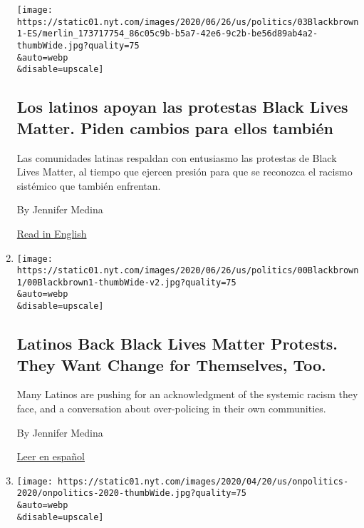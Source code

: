 \begin{enumerate}
  \texttt{[image: https://static01.nyt.com/images/2020/06/26/us/politics/03Blackbrown1-ES/merlin\_173717754\_86c05c9b-b5a7-42e6-9c2b-be56d89ab4a2-thumbWide.jpg?quality=75\\\&auto=webp\\\&disable=upscale]}

  \hypertarget{los-latinos-apoyan-las-protestas-black-lives-matter-piden-cambios-para-ellos-tambiuxe9n}{%
  \subsection{Los latinos apoyan las protestas Black Lives Matter. Piden
  cambios para ellos
  también}\label{los-latinos-apoyan-las-protestas-black-lives-matter-piden-cambios-para-ellos-tambiuxe9n}}

  Las comunidades latinas respaldan con entusiasmo las protestas de
  Black Lives Matter, al tiempo que ejercen presión para que se
  reconozca el racismo sistémico que también enfrentan.

  By Jennifer Medina

  \href{https://www.nytimes.com/2020/07/03/us/politics/latinos-police-racism-black-lives-matter.html}{Read
  in English}
\item
  \href{/2020/07/03/us/politics/latinos-police-racism-black-lives-matter.html}{}

  \texttt{[image: https://static01.nyt.com/images/2020/06/26/us/politics/00Blackbrown1/00Blackbrown1-thumbWide-v2.jpg?quality=75\\\&auto=webp\\\&disable=upscale]}

  \hypertarget{latinos-back-black-lives-matter-protests-they-want-change-for-themselves-too}{%
  \subsection{Latinos Back Black Lives Matter Protests. They Want Change
  for Themselves,
  Too.}\label{latinos-back-black-lives-matter-protests-they-want-change-for-themselves-too}}

  Many Latinos are pushing for an acknowledgment of the systemic racism
  they face, and a conversation about over-policing in their own
  communities.

  By Jennifer Medina

  \href{https://www.nytimes.com/es/2020/07/03/espanol/latinos-racismo.html}{Leer
  en español}
\item
  \href{/2020/06/29/us/politics/biden-black-woman-running-mate.html}{}

  \texttt{[image: https://static01.nyt.com/images/2020/04/20/us/onpolitics-2020/onpolitics-2020-thumbWide.jpg?quality=75\\\&auto=webp\\\&disable=upscale]}


\end{enumerate}
